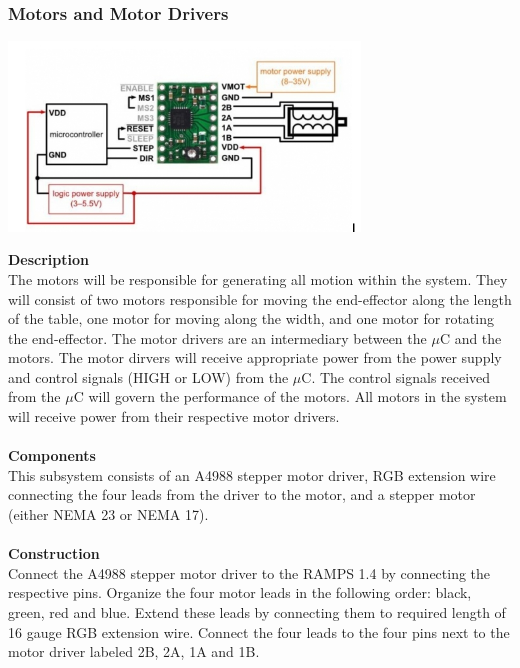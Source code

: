 \documentclass[titlepage]{article}
\begin{document}
\subsubsection{Motors and Motor Drivers}
\begin{center}
	\includegraphics[width = 0.7\textwidth]{Motors.png}
\label{fig:MotorsFig}
\end{center}
\textbf{Description}\\
The motors will be responsible for generating all motion within the system. They will consist of two motors responsible for moving the end-effector along the length of the table, one motor for moving along the width, and one motor for rotating the end-effector. The motor drivers are an intermediary between the $\mu$C and the motors. The motor dirvers will receive appropriate power from the power supply and control signals (HIGH or LOW) from the $\mu$C. The control signals received from the $\mu$C will govern the performance of the motors. All motors in the system will receive power from their respective motor drivers.\\\\
\textbf{Components}\\
This subsystem consists of an A4988 stepper motor driver, RGB extension wire connecting the four leads from the driver to the motor, and a stepper motor (either NEMA 23 or NEMA 17).\\\\
\textbf{Construction}\\
Connect the A4988 stepper motor driver to the RAMPS 1.4 by connecting the respective pins. Organize the four motor leads in the following order: black, green, red and blue. Extend these leads by connecting them to required length of 16 gauge RGB extension wire. Connect the four leads to the four pins next to the motor driver labeled 2B, 2A, 1A and 1B.
\end{document}
